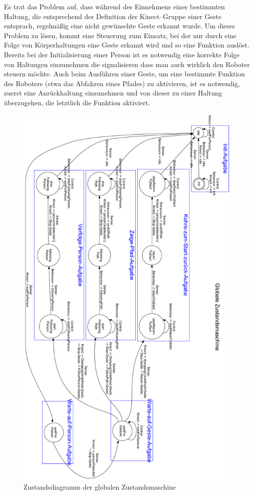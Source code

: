Es trat das Problem auf, dass während des Einnehmens einer bestimmten Haltung, die entsprechend der Definition der Kinect--Gruppe einer Geste entsprach, regelmäßig eine nicht gewünschte Geste erkannt wurde.
Um dieses Problem zu lösen, kommt eine Steuerung zum Einsatz, bei der nur durch eine Folge von Körperhaltungen eine Geste erkannt wird und so eine Funktion auslöst.
Bereits bei der Initialisierung einer Person ist es notwendig eine korrekte Folge von Haltungen einzunehmen die signalisieren dass man auch wirklich den Roboter steuern möchte.
Auch beim Ausführen einer Geste, um eine bestimmte Funktion des Roboters (etwa das Abfahren eines Pfades) zu aktivieren, ist es notwendig, zuerst eine Anrückhaltung einzunehmen und von dieser zu einer Haltung überzugehen, die letztlich die Funktion aktiviert.

\begin{landscape}
\begin{figure}
	\includegraphics[scale=0.43,angle=90]{graphics/SCHEMA-GlobalStateMachine-hk.pdf}
	\caption{Zustandsdiagramm der globalen Zustandsmaschine}
	\label{fig:integration_statemachine}
\end{figure}
\end{landscape}

